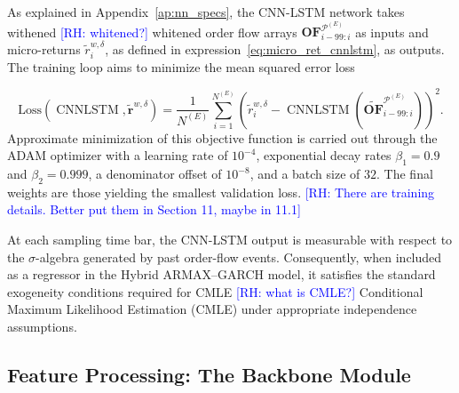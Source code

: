 \documentclass[10pt,a4paper,oneside]{article}
\newcommand{\rh}[1]{\textcolor{blue}{\textsf{[RH: #1]}}}
\DeclareMathOperator{\cnnlstm}{CNNLSTM}
\providecommand{\DIFaddtex}[1]{{\protect\color{blue} \sf #1}} %
\providecommand{\DIFdeltex}[1]{{\protect\color{red} \scriptsize #1}} %
\providecommand{\DIFaddbegin}{} %
\providecommand{\DIFaddend}{} %
\providecommand{\DIFdelbegin}{} %
\providecommand{\DIFdelend}{} %
\providecommand{\DIFadd}[1]{\texorpdfstring{\DIFaddtex{#1}}{#1}} %
\providecommand{\DIFdel}[1]{\texorpdfstring{\DIFdeltex{#1}}{}} %
\newcommand{\DIFscaledelfig}{0.5}
\newlength{\DIFdelgraphicswidth} %
\newlength{\DIFdelgraphicsheight} %
\newcommand{\DIFaddincludegraphics}[2][]{{\color{blue}\fbox{\DIFOincludegraphics[#1]{#2}}}} %
\newcommand{\DIFdelincludegraphics}[2][]{%
\sbox{\DIFdelgraphicsbox}{\DIFOincludegraphics[#1]{#2}}%
\settoboxwidth{\DIFdelgraphicswidth}{\DIFdelgraphicsbox} %
\settoboxtotalheight{\DIFdelgraphicsheight}{\DIFdelgraphicsbox} %
\scalebox{\DIFscaledelfig}{%
\parbox[b]{\DIFdelgraphicswidth}{\usebox{\DIFdelgraphicsbox}\\[-\baselineskip] \rule{\DIFdelgraphicswidth}{0em}}\llap{\resizebox{\DIFdelgraphicswidth}{\DIFdelgraphicsheight}{%
\setlength{\unitlength}{\DIFdelgraphicswidth}%
\begin{picture}(1,1)%
\thicklines\linethickness{2pt} %
{\color[rgb]{1,0,0}\put(0,0){\framebox(1,1){}}}%
{\color[rgb]{1,0,0}\put(0,0){\line( 1,1){1}}}%
{\color[rgb]{1,0,0}\put(0,1){\line(1,-1){1}}}%
\end{picture}%
}\hspace*{3pt}}} %
} %
\DeclareRobustCommand{\DIFaddbegin}{\DIFOaddbegin \let\includegraphics\DIFaddincludegraphics} %
\DeclareRobustCommand{\DIFaddend}{\DIFOaddend \let\includegraphics\DIFOincludegraphics} %
\DeclareRobustCommand{\DIFdelbegin}{\DIFOdelbegin \let\includegraphics\DIFdelincludegraphics} %
\DeclareRobustCommand{\DIFdelend}{\DIFOaddend \let\includegraphics\DIFOincludegraphics} %
\begin{document}
As explained in Appendix~\ref{ap:nn_specs}, the CNN-LSTM network takes \DIFdelbegin \DIFdel{withened \rh{whitened?} }\DIFdelend \DIFaddbegin \DIFadd{whitened }\DIFaddend order flow arrays $\mathbf{OF}^{\mathcal{P}^{(E)}}_{i - 99:i}$ as inputs and micro-returns $\tilde{r}_i^{w, \delta}$, as defined in expression~\eqref{eq:micro_ret_cnnlstm}, as outputs. The training loop aims to minimize the mean squared error loss

\[
    \text{Loss}(\cnnlstm, \tilde{\mathbf{r}}^{w, \delta})
    =
    \frac{1}{N^{(E)}}
    \sum_{i=1}^{N^{(E)}}
    \left(\tilde{r}_i^{w, \delta} - \cnnlstm\left(\widetilde{\mathbf{OF}}^{\mathcal{P}^{(E)}}_{i - 99:i} \right)\right)^2.
\]
Approximate minimization of this objective function is carried out through the ADAM optimizer \cite{kingma2014adam} with a learning rate of \(10^{-4}\), exponential decay rates \(\beta_1 = 0.9\) and \(\beta_2 = 0.999\), a denominator offset of \(10^{-8}\), and a batch size of \(32\). The final weights are those yielding the smallest validation loss.
\DIFdelbegin \DIFdel{\rh{There are training details. Better put them in Section 11, maybe in 11.1}
}\DIFdelend 

At each sampling time bar, the CNN-LSTM output is measurable with respect to the $\sigma$-algebra generated by past order-flow events. Consequently, when included as a regressor in the Hybrid ARMAX–GARCH model, it satisfies the standard exogeneity conditions required for \DIFdelbegin \DIFdel{CMLE \rh{what is CMLE?} }\DIFdelend \DIFaddbegin \DIFadd{Conditional Maximum Likelihood Estimation (CMLE) }\DIFaddend under appropriate independence assumptions.

\subsection{Feature Processing: The Backbone Module}
\label{subsec:feature_extraction}
\end{document}

